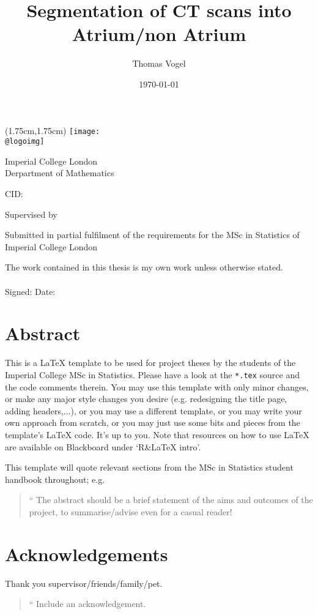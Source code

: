 \documentclass[11pt,a4,twosided,singlespacing,titlepagenumber=on]{scrreprt}
\title{Segmentation of CT scans into Atrium/non Atrium}
\author{Thomas Vogel}
\date{\today}
\makeatletter
\numberwithin{equation}{chapter} %
\renewcommand{\maketitle}{
\begin{titlepage}
\ifdefined\@logoimg
\begin{textblock*}{8cm}(1.75cm,1.75cm)
\texttt{[image: \\@logoimg]}
\end{textblock*}
\vspace*{1cm}
\else
\fi
\begin{center}
\vspace*{\stretch{0.1}}
Imperial College London\\
Derpartment of Mathematics\par
\vspace*{\stretch{1}} %
{\titlefont\Huge \@title\par} %
\vspace*{\stretch{2}}
{\Large \@author \par}
\vspace*{1em}
{\large CID: \@CID \par}
\vspace*{\stretch{0.5}}
{\large Supervised by \@supervisor \par}
\vspace*{\stretch{3}}
{\Large \@date \par}
\vspace*{\stretch{1}}
{\large Submitted in partial fulfilment of the requirements for the
MSc in Statistics of Imperial College London}
\vspace*{\stretch{0.1}}
\end{center}%
\end{titlepage}%
}
\newcommand*{\declaration}{%
\vspace*{0.3\textheight}
The work contained in this thesis is my own work unless
otherwise stated.\\
\vspace*{0.1\textheight}\\
\hspace*{0.25\textwidth}Signed: \hspace{0.25\textwidth} Date:
\clearpage}
\renewenvironment{abstract}%
{\chapter*{Abstract}\thispagestyle{plain}}%
{\clearpage}
\newenvironment{myquote}%
{\begin{quote}{\Large{}``}}%
{\ifhmode\unskip\fi{\Large{}''}\end{quote}}
\makeatother
\begin{document}
\maketitle %

\declaration %

\begin{abstract}
This is a \LaTeX{} template to be used for project theses by the students of the Imperial College MSc in Statistics. Please have a look at the \verb|*.tex| source and the code comments therein. You may use this template with only minor changes, or make any major style changes you desire (e.g. redesigning the title page, adding headers,...), or you may use a different template, or you may write your own approach from scratch, or you may just use some bits and pieces from the template's \LaTeX{} code. It's up to you. Note that resources on how to use \LaTeX{} are available on Blackboard under `R\&{}LaTeX intro'.

This template will quote relevant sections from the MSc in Statistics student handbook throughout; e.g.
\begin{myquote}
The abstract should be a brief statement of the aims and outcomes of the project, to summarise/advise
even for a casual reader!
\end{myquote}
\end{abstract}
\newpage
\chapter*{Acknowledgements}
Thank you supervisor/friends/family/pet.
\begin{myquote}
Include an acknowledgement.
\end{myquote}
\newpage

\renewcommand{\contentsname}{Table of Contents}
\tableofcontents
\newpage




%
%
%
\end{document}
